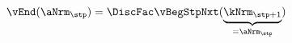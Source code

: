   \begin{equation}\begin{gathered}\begin{aligned}
\vEnd(\aNrm_{\stp}) & = \DiscFac \vBegStpNxt(\underbrace{\kNrm_{\stp+1}}_{=\aNrm_{\stp}}) \label{eq:vEnd}
      \end{aligned}\end{gathered}\end{equation}
